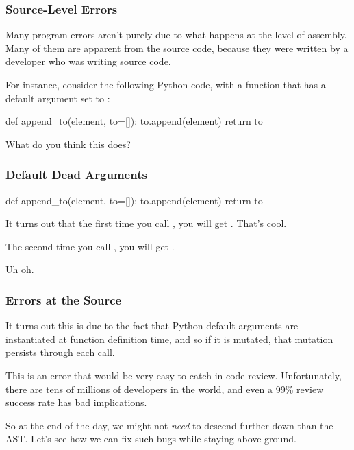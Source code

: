 \documentclass[aspectratio=169, handout]{beamer}
\begin{document}
 \begin{frame}[fragile]
   \frametitle{Source-Level Errors}

   Many program errors aren't purely due to what happens
   at the level of assembly. Many of them are apparent from the source code,
   because they were written by a developer who was writing source code.

   \pause
   \vspace{\fill}

   For instance, consider the following Python code, with a function that
   has a default argument  set to \code{[]}:
   \begin{pythoncodeblock}
     def append_to(element, to=[]):
       to.append(element)
       return to
   \end{pythoncodeblock}

   \vspace{\fill}
   \pause

   What do you think this does?
 \end{frame}

 \begin{frame}[fragile]
   \frametitle{Default Dead Arguments}

   \begin{pythoncodeblock}
     def append_to(element, to=[]):
       to.append(element)
       return to
   \end{pythoncodeblock}

   \vspace{\fill}

   It turns out that the first time you call , you will
   get \code{[2]}. That's cool.

   \pause
   \vspace{\fill}

   The second time you call , you will get \code{[2, 2]}.

   \pause
   \vspace{\fill}

   Uh oh.
 \end{frame}

 \begin{frame}[fragile]
   \frametitle{Errors at the Source}

   It turns out this is due to the fact that Python default arguments are
   instantiated at function definition time, and so if it is mutated, that
   mutation persists through each call.

   \pause
   \vspace{\fill}

   This is an error that would be very easy to catch in code review. Unfortunately,
   there are tens of millions of developers in the world, and even a 99\%
   review success rate has bad implications.

   \pause
   \vspace{\fill}

   So at the end of the day, we might not \textit{need} to descend further down
   than the AST. Let's see how we can fix such bugs while staying above ground.
 \end{frame}
\end{document}

